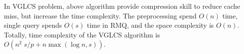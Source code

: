 In VGLCS problem, above algorithm provide compression skill to reduce
cache miss, but increase the time complexity.  The preprocessing spend
$O(n)$ time, single query spends $O(s)$ time in RMQ, and the space
complexity is  $O(n)$.  Totally, time complexity of the VGLCS algorithm
is $O(n^2 \; s / p + n \max(\log n, s))$.

\iffalse
回到 VGLCS 的應用中，上述算法使用壓縮方式降低快取未中。
我們可以使用上述的算法取代原先的并查集，建表的時間複雜度為 $O(n)$，
單一查詢的時間複雜度為 $O(s)$。
整體的時間複雜度為 $O(n^2 \; s / p + n \max(\log n, s))$。
\fi
